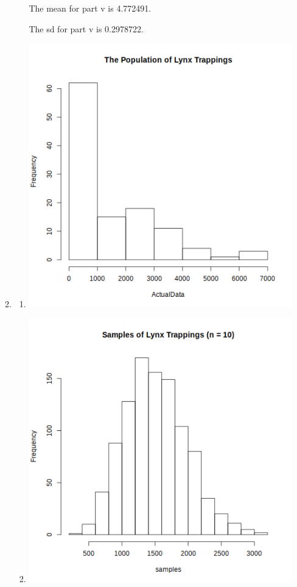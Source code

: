 \documentclass[12pt,letterpaper]{article}
\begin{document}
\begin{enumerate}
\begin{enumerate}
\begin{enumerate}
              The mean for part v is \num{4.772491}.

              The sd for part v is \num{0.2978722}.
          \end{enumerate}
        \item
          \begin{enumerate}
            \item
              \includegraphics[width=\linewidth]{prob3b.png}

            \item
              \includegraphics[width=\linewidth]{prob3b_ii.png}


\end{enumerate}
\end{enumerate}
\end{enumerate}
\end{document}
